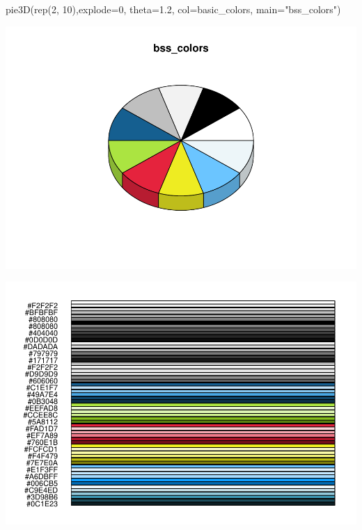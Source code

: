 \documentclass[
]{article}
\newenvironment{Shaded}{\begin{snugshade}}{\end{snugshade}}
\newcommand{\AttributeTok}[1]{\textcolor[rgb]{0.77,0.63,0.00}{#1}}
\newcommand{\CommentTok}[1]{\textcolor[rgb]{0.56,0.35,0.01}{\textit{#1}}}
\newcommand{\DecValTok}[1]{\textcolor[rgb]{0.00,0.00,0.81}{#1}}
\newcommand{\FloatTok}[1]{\textcolor[rgb]{0.00,0.00,0.81}{#1}}
\newcommand{\FunctionTok}[1]{\textcolor[rgb]{0.00,0.00,0.00}{#1}}
\newcommand{\NormalTok}[1]{#1}
\newcommand{\OtherTok}[1]{\textcolor[rgb]{0.56,0.35,0.01}{#1}}
\newcommand{\SpecialCharTok}[1]{\textcolor[rgb]{0.00,0.00,0.00}{#1}}
\newcommand{\StringTok}[1]{\textcolor[rgb]{0.31,0.60,0.02}{#1}}
\begin{document}
\begin{Shaded}
\begin{Highlighting}[]

\FunctionTok{pie3D}\NormalTok{(}\FunctionTok{rep}\NormalTok{(}\DecValTok{2}\NormalTok{, }\DecValTok{10}\NormalTok{),}\AttributeTok{explode=}\DecValTok{0}\NormalTok{, }\AttributeTok{theta=}\FloatTok{1.2}\NormalTok{, }\AttributeTok{col=}\NormalTok{basic\_colors, }\AttributeTok{main=}\StringTok{"bss\_colors"}\NormalTok{)}
\end{Highlighting}
\end{Shaded}

\includegraphics[width=1\linewidth]{man/figures/README-unnamed-chunk-2-1}

\begin{Shaded}
\end{Shaded}

\includegraphics[width=1\linewidth]{man/figures/README-unnamed-chunk-2-2}
\end{document}

